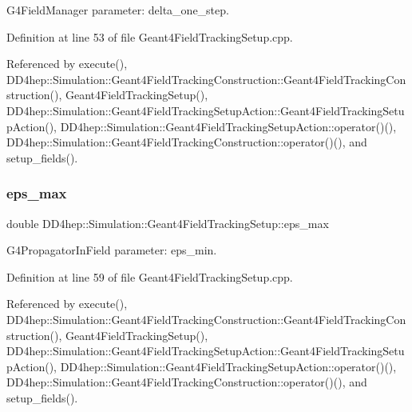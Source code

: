G4\+Field\+Manager parameter\+: delta\+\_\+one\+\_\+step. 



Definition at line 53 of file Geant4\+Field\+Tracking\+Setup.\+cpp.



Referenced by execute(), D\+D4hep\+::\+Simulation\+::\+Geant4\+Field\+Tracking\+Construction\+::\+Geant4\+Field\+Tracking\+Construction(), Geant4\+Field\+Tracking\+Setup(), D\+D4hep\+::\+Simulation\+::\+Geant4\+Field\+Tracking\+Setup\+Action\+::\+Geant4\+Field\+Tracking\+Setup\+Action(), D\+D4hep\+::\+Simulation\+::\+Geant4\+Field\+Tracking\+Setup\+Action\+::operator()(), D\+D4hep\+::\+Simulation\+::\+Geant4\+Field\+Tracking\+Construction\+::operator()(), and setup\+\_\+fields().

\hypertarget{struct_d_d4hep_1_1_simulation_1_1_geant4_field_tracking_setup_a1402c7ed2e3696d92cd8a97b48d175bf}{}\label{struct_d_d4hep_1_1_simulation_1_1_geant4_field_tracking_setup_a1402c7ed2e3696d92cd8a97b48d175bf} 
\subsubsection{\texorpdfstring{eps\+\_\+max}{eps\_max}}
{\footnotesize\ttfamily double D\+D4hep\+::\+Simulation\+::\+Geant4\+Field\+Tracking\+Setup\+::eps\+\_\+max\hspace{0.3cm}{\ttfamily [protected]}}



G4\+Propagator\+In\+Field parameter\+: eps\+\_\+min. 



Definition at line 59 of file Geant4\+Field\+Tracking\+Setup.\+cpp.



Referenced by execute(), D\+D4hep\+::\+Simulation\+::\+Geant4\+Field\+Tracking\+Construction\+::\+Geant4\+Field\+Tracking\+Construction(), Geant4\+Field\+Tracking\+Setup(), D\+D4hep\+::\+Simulation\+::\+Geant4\+Field\+Tracking\+Setup\+Action\+::\+Geant4\+Field\+Tracking\+Setup\+Action(), D\+D4hep\+::\+Simulation\+::\+Geant4\+Field\+Tracking\+Setup\+Action\+::operator()(), D\+D4hep\+::\+Simulation\+::\+Geant4\+Field\+Tracking\+Construction\+::operator()(), and setup\+\_\+fields().


